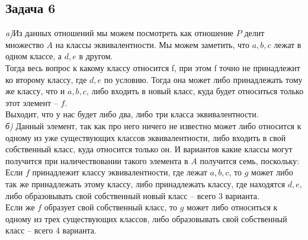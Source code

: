 	\subsection{Задача 6}
	\textit{a)}Из данных отношений мы можем посмотреть как отношение $P$ делит множество $A$ на классы эквивалентности. Мы можем заметить, что $a,b,c$ лежат в одном классе, а $d,e$ в другом. \\
	Тогда весь вопрос к какому классу относится f, при этом f точно не принадлежит ко второму классу, где $d,e$ по условию. Тогда она может либо принадлежать тому же классу, что и $a,b,c$, либо входить в новый класс, куда будет относиться только этот элемент -- $f$.\\
	Выходит, что у нас будет либо два, либо три класса эквивалентности. \\
	\textit{б)} Данный элемент, так как про него ничего не известно может либо относится к одному из уже существующих классов эквивалентности, либо входить в свой собственный класс, куда относится только он. 
	И вариантов какие классы могут получится при наличествовании такого элемента в $A$ получится семь, поскольку: \\
	Если $f$ принадлежит классу эквивалентности, где лежат $a,b,c$, то $g$ может либо так же принадлежать этому классу, либо принадлежать классу, где находятся $d,e$, либо образовывать свой собственный новый класс -- всего 3 варианта. \\
	Если же $f$ образует свой собственный класс, то $g$ может либо относиться к одному из трех существующих классов, либо образовывать свой собственный класс -- всего 4 варианта.
	

